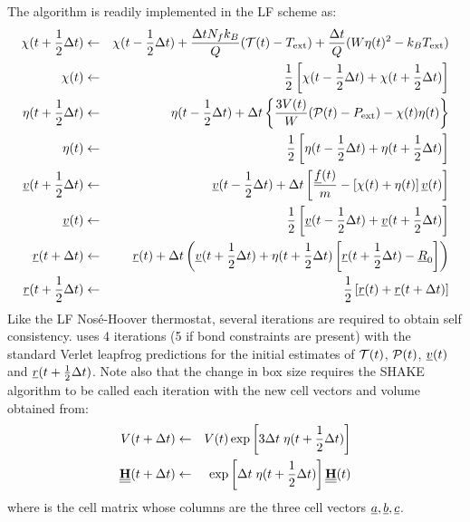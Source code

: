 The algorithm is readily implemented in the LF scheme as:
\begin{eqnarray}
\chi(t+{1\over2}\Delta t) &\leftarrow& \chi(t-{1\over 2}\Delta t) +
{\Delta t N_f k_B \over Q} ( {\cal T}(t) - T_{\rm ext} ) 
+ {\Delta t\over Q}(W\eta(t)^2-k_B T_{\rm ext})\nonumber\\
\chi(t) &\leftarrow& {1\over 2} \left[\chi(t-{1\over 2}\Delta t)+\chi(t+{1\over 2}\Delta t)\right]\nonumber\\
\eta(t+{1\over2}\Delta t) &\leftarrow& \eta(t-{1\over 2}\Delta t) +
\Delta t \left \{{3V(t) \over
W} ( {\cal P}(t) - P_{\rm ext}) - \chi(t)\eta(t)\right\}\nonumber\\
\eta(t) &\leftarrow& {1\over 2} \left[\eta(t-{1\over 2}\Delta t)+\eta(t+{1\over 2}\Delta t)\right]\nonumber\\
\mbox{$\underline{v}$}(t + {1\over 2} \Delta t)&\leftarrow& \mbox{$\underline{v}$}(t-{1\over 2} \Delta t) +
 \Delta t\left[ {\mbox{$\underline{f}$}(t)\over m} - \left[\chi(t)+\eta(t)\right]\mbox{$\underline{v}$}(t)\right]\nonumber\\
\mbox{$\underline{v}$}(t)& \leftarrow& {1\over 2} \left[\mbox{$\underline{v}$}(t-{1\over 2}\Delta t)
    +\mbox{$\underline{v}$}(t+{1\over 2}\Delta t)\right]\nonumber\\
\mbox{$\underline{r}$}(t+\Delta t) &\leftarrow& \mbox{$\underline{r}$}(t) + \Delta t \left(\mbox{$\underline{v}$}(t+{1\over 2}\Delta t) + \eta(
t+{1\over2}\Delta t)\left[\mbox{$\underline{r}$}(t+{1\over 2}\Delta t)-\mbox{$\underline{R}$}_0\right]\right)\nonumber \\
\mbox{$\underline{r}$}(t+{1\over 2}\Delta t) &\leftarrow& {1\over 2} \left[ \mbox{$\underline{r}$}(t)+ \mbox{$\underline{r}$}(t+\Delta t)\right]
\end{eqnarray}
Like the LF Nos\'e-Hoover
thermostat, 
several iterations are
required to obtain self consistency. \D{} uses 4 iterations (5 if bond
constraints are present) with the standard
Verlet leapfrog predictions for the initial
estimates of ${\cal T}(t)$, ${\cal P}(t)$, $\mbox{$\underline{v}$}(t)$ and
$\mbox{$\underline{r}$}(t+{1\over 2}\Delta t)$.  Note also that the change in box
size requires the SHAKE algorithm to be called each iteration with the
new cell vectors and volume  obtained from:
\begin{eqnarray}
V(t+\Delta t)& \leftarrow& V(t) \exp\left[3\Delta t\; \eta(t+{1\over 2}\Delta t)\right]\nonumber\\
\mbox{$\underline{\underline{\bf H}}$}(t+\Delta t) &\leftarrow& \exp\left[\Delta t \;\eta(t+{1\over 2}\Delta t)\right]\mbox{$\underline{\underline{\bf H}}$}(t)
\end{eqnarray}
where  is the cell matrix whose columns are the three cell vectors $\mbox{$\underline{a}$}, \mbox{$\underline{b}$}, \mbox{$\underline{c}$}$.

